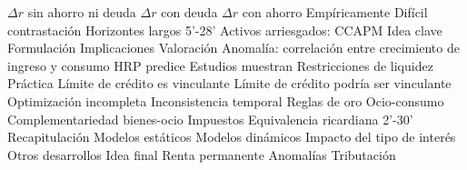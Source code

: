 \documentclass{nuevotema}
\begin{document}
\begin{esquema}[enumerate]
			\3 $\varDelta r$ sin ahorro ni deuda
			\3 $\varDelta r$ con deuda
			\3 $\varDelta r$ con ahorro
		\2 Empíricamente
			\3 Difícil contrastación
			\3 Horizontes largos
	\1  5'-28'
		\2 Activos arriesgados: CCAPM
			\3 Idea clave
			\3 Formulación
			\3 Implicaciones
			\3 Valoración
		\2 Anomalía: correlación entre crecimiento de ingreso y consumo
			\3 HRP predice
			\3 Estudios muestran
		\2 Restricciones de liquidez
			\3 Práctica
			\3 Límite de crédito es vinculante
			\3 Límite de crédito podría ser vinculante
		\2 Optimización incompleta
			\3 Inconsistencia temporal
			\3 Reglas de oro
		\2 Ocio-consumo
			\3 Complementariedad bienes-ocio
			\3 Impuestos
		\2 Equivalencia ricardiana
	\1[]  2'-30'
		\2 Recapitulación
			\3 Modelos estáticos
			\3 Modelos dinámicos
			\3 Impacto del tipo de interés
			\3 Otros desarrollos
		\2 Idea final
			\3 Renta permanente
			\3 Anomalías
			\3 Tributación

\end{esquema}

\esquemalargo
\end{document}
